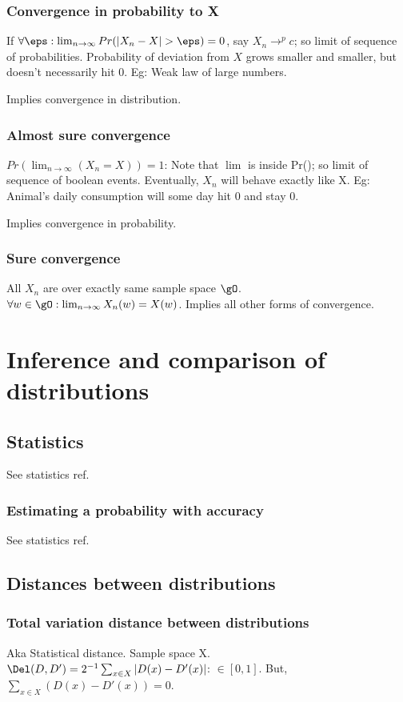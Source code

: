 \documentclass[oneside, article]{memoir}
\begin{document}
\section{Convergence in probability to X}
If $\forall \eps: \lim_{n \to \infty}Pr(|X_n - X| > \eps) = 0$, say $X_n \to^p c$; so limit of sequence of probabilities. Probability of deviation from $X$ grows smaller and smaller, but doesn't necessarily hit 0. Eg: Weak law of large numbers.

Implies convergence in distribution.

\section{Almost sure convergence}
$Pr(\lim_{n \to \infty}(X_n = X)) = 1$: Note that $\lim$ is inside Pr(); so limit of sequence of boolean events. Eventually, $X_n$ will behave exactly like X. Eg: Animal's daily consumption will some day hit 0 and stay 0.

Implies convergence in probability.

\section{Sure convergence}
All $X_n$ are over exactly same sample space $\gO$. $\forall w \in \gO: \lim_{n \to \infty} X_n(w) = X(w)$. Implies all other forms of convergence.

\part{Inference and comparison of distributions}
\chapter{Statistics}
See statistics ref.

\section{Estimating a probability with accuracy }
See statistics ref.

\chapter{Distances between distributions}
\section{Total variation distance between distributions}
Aka Statistical distance. Sample space X. $\Del(D, D') = 2^{-1} \sum_{x \in X} |D(x) - D'(x)|$: $\in [0,1]$. But, $\sum_{x \in X} (D(x) - D'(x)) = 0$.
\end{document}

